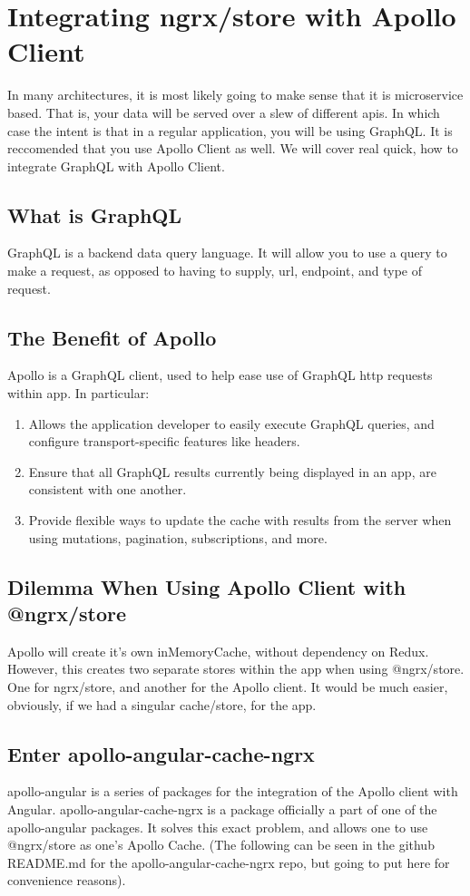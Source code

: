 
\chapter{ Integrating ngrx/store with Apollo Client }
In many architectures, it is most likely going to make sense that it is
microservice based. That is, your data will be served over a slew of different
apis. In which case the intent is that in a regular application, you will be
using GraphQL. It is reccomended that you use Apollo Client as well. We will
cover real quick, how to integrate GraphQL with Apollo Client.

\section{ What is GraphQL }
GraphQL is a backend data query language. It will allow you to use a query to
make a request, as opposed to having to supply, url, endpoint, and type of
request.

\section{ The Benefit of Apollo }
Apollo is a GraphQL client, used to help ease use of GraphQL http requests
within app. In particular:
\begin{enumerate}
  \item Allows the application developer to easily execute GraphQL queries, and
  configure transport-specific features like headers.
  \item Ensure that all GraphQL results currently being displayed in an app, are
   consistent with one another.
  \item Provide flexible ways to update the cache with results from the server
  when using mutations, pagination, subscriptions, and more.
\end{enumerate}

\section{ Dilemma When Using Apollo Client with @ngrx/store }
Apollo will create it’s own inMemoryCache, without dependency on Redux. However,
this creates two separate stores within the app when using @ngrx/store.
One for ngrx/store, and another for the Apollo client. It would be much easier,
obviously, if we had a singular cache/store, for the app.

\section{ Enter apollo-angular-cache-ngrx }
apollo-angular is a series of packages for the integration of the Apollo client
with Angular. apollo-angular-cache-ngrx is a package officially a part of one of
the apollo-angular packages. It solves this exact problem, and allows one to use
@ngrx/store as one’s Apollo Cache. (The following can be seen in the github
README.md for the apollo-angular-cache-ngrx repo, but going to put here for
convenience reasons).

